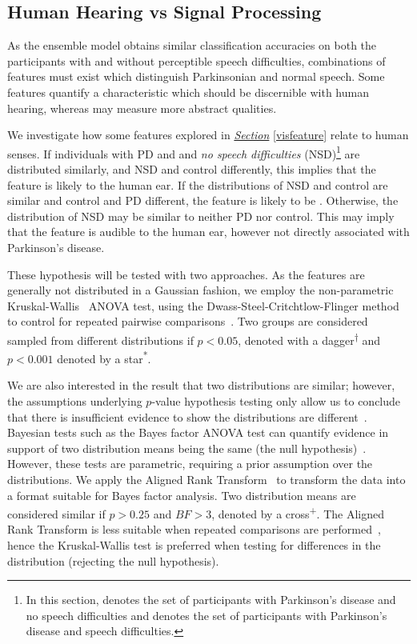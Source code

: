 \documentclass[12pt, twoside]{book}
\renewcommand\emph[1]{\textit{\color{USred}{#1}}}
\begin{document}
\subsection{Human Hearing vs Signal Processing}
\label{formalfeatures}
As the ensemble model obtains similar classification accuracies on both the participants with and without perceptible speech difficulties, combinations of features must exist which distinguish Parkinsonian and normal speech. Some features quantify a characteristic which should be discernible with human hearing, whereas may measure more abstract qualities. 

We investigate how some features explored in \textit{\hyperref[visfeature]{Section}} \ref{visfeature} relate to human senses. If individuals with PD and and \textit{no speech difficulties} (NSD)\footnote{In this section, \emph{NSD} denotes the set of participants with Parkinson's disease and no speech difficulties and \emph{PD} denotes the set of participants with Parkinson's disease and speech difficulties.} are distributed similarly, and NSD and control differently, this implies that the feature is likely \emph{inaudible} to the human ear. If the distributions of NSD and control are similar and control and PD different, the feature is likely to be \emph{audible}. Otherwise, the distribution of NSD may be similar to neither PD nor control. This may imply that the feature is audible to the human ear, however not directly associated with Parkinson's disease. 


These hypothesis will be tested with two approaches. As the features are generally not distributed in a Gaussian fashion, we employ the non-parametric Kruskal-Wallis~\cite{kruskal1952use} ANOVA test, using the Dwass-Steel-Critchtlow-Flinger method to control for repeated pairwise comparisons~\cite{DCSF}. Two groups are considered sampled from different distributions if $p<0.05$, denoted with a dagger\textsuperscript{†} and $p<0.001$ denoted by a star\textsuperscript{*}. 

We are also interested in the result that two distributions are similar; however, the assumptions underlying $p$-value hypothesis testing only allow us to conclude that there is insufficient evidence to show the distributions are different~\cite{fisher1937design}. Bayesian tests such as the Bayes factor ANOVA test can quantify evidence in support of two distribution means being the same (the null hypothesis)~\cite{bayesianttests}. However, these tests are parametric, requiring a prior assumption over the distributions. We apply the Aligned Rank Transform~\cite{artool} to transform the data into a format suitable for Bayes factor analysis. Two distribution means are considered similar if $p>0.25$ and $BF>3$, denoted by a cross\textsuperscript{+}. The Aligned Rank Transform is less suitable when repeated comparisons are performed~\cite{fan2017rank}, hence the Kruskal-Wallis test is preferred when testing for differences in the distribution (rejecting the null hypothesis).
\end{document}
